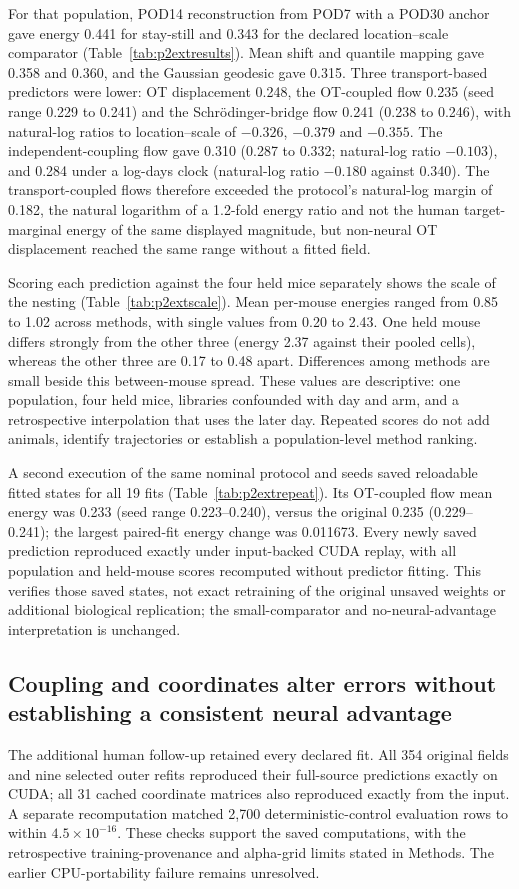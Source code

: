 For that population, POD14 reconstruction from POD7 with a POD30 anchor gave energy 0.441 for stay-still and 0.343 for the declared location--scale comparator (Table~\ref{tab:p2extresults}). Mean shift and quantile mapping gave 0.358 and 0.360, and the Gaussian geodesic gave 0.315. Three transport-based predictors were lower: OT displacement 0.248, the OT-coupled flow 0.235 (seed range 0.229 to 0.241) and the Schr\"odinger-bridge flow 0.241 (0.238 to 0.246), with natural-log ratios to location--scale of $-0.326$, $-0.379$ and $-0.355$. The independent-coupling flow gave 0.310 (0.287 to 0.332; natural-log ratio $-0.103$), and 0.284 under a log-days clock (natural-log ratio $-0.180$ against 0.340). The transport-coupled flows therefore exceeded the protocol's natural-log margin of 0.182, the natural logarithm of a 1.2-fold energy ratio and not the human target-marginal energy of the same displayed magnitude, but non-neural OT displacement reached the same range without a fitted field.

Scoring each prediction against the four held mice separately shows the scale of the nesting (Table~\ref{tab:p2extscale}). Mean per-mouse energies ranged from 0.85 to 1.02 across methods, with single values from 0.20 to 2.43. One held mouse differs strongly from the other three (energy 2.37 against their pooled cells), whereas the other three are 0.17 to 0.48 apart. Differences among methods are small beside this between-mouse spread. These values are descriptive: one population, four held mice, libraries confounded with day and arm, and a retrospective interpolation that uses the later day. Repeated scores do not add animals, identify trajectories or establish a population-level method ranking.

A second execution of the same nominal protocol and seeds saved reloadable fitted states for all 19 fits (Table~\ref{tab:p2extrepeat}). Its OT-coupled flow mean energy was 0.233 (seed range 0.223--0.240), versus the original 0.235 (0.229--0.241); the largest paired-fit energy change was 0.011673. Every newly saved prediction reproduced exactly under input-backed CUDA replay, with all population and held-mouse scores recomputed without predictor fitting. This verifies those saved states, not exact retraining of the original unsaved weights or additional biological replication; the small-comparator and no-neural-advantage interpretation is unchanged.

\subsection{Coupling and coordinates alter errors without establishing a consistent neural advantage}
The additional human follow-up retained every declared fit. All 354 original fields and nine selected outer refits reproduced their full-source predictions exactly on CUDA; all 31 cached coordinate matrices also reproduced exactly from the input. A separate recomputation matched 2,700 deterministic-control evaluation rows to within $4.5\times10^{-16}$. These checks support the saved computations, with the retrospective training-provenance and alpha-grid limits stated in Methods. The earlier CPU-portability failure remains unresolved.

